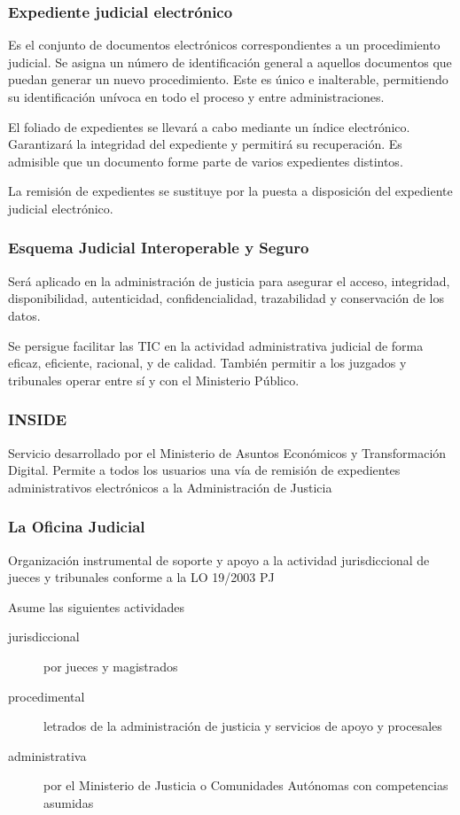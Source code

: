     \subsubsection{Expediente judicial electrónico } %
        Es el conjunto de documentos electrónicos correspondientes a un procedimiento judicial. Se asigna un número de identificación general a aquellos documentos que puedan generar un nuevo procedimiento. Este es único e inalterable, permitiendo su identificación unívoca en todo el proceso y entre administraciones.

        El foliado de expedientes se llevará a cabo mediante un índice electrónico. Garantizará la integridad del expediente y permitirá su recuperación. Es admisible que un documento forme parte de varios expedientes distintos.

        La remisión de expedientes se sustituye por la puesta a disposición del expediente judicial electrónico.

    \subsubsection{Esquema Judicial Interoperable y Seguro} %
        Será aplicado en la administración de justicia para asegurar el acceso, integridad, disponibilidad, autenticidad, confidencialidad, trazabilidad y conservación de los datos.

        Se persigue facilitar las TIC en la actividad administrativa judicial de forma eficaz, eficiente, racional, y de calidad. También permitir a los juzgados y tribunales operar entre sí y con el Ministerio Público.

    \subsubsection{INSIDE} %
        Servicio desarrollado por el Ministerio de Asuntos Económicos y Transformación Digital. Permite a todos los usuarios una vía de remisión de expedientes administrativos electrónicos a la Administración de Justicia

    \subsubsection{La Oficina Judicial} %
        Organización instrumental de soporte y apoyo a la actividad jurisdiccional de jueces y tribunales conforme a la LO 19/2003 PJ

        Asume las siguientes actividades
        \begin{description}
            \item[jurisdiccional] por jueces y magistrados
            \item[procedimental] letrados de la administración de justicia y servicios de apoyo y procesales
            \item[administrativa] por el Ministerio de Justicia o Comunidades Autónomas con competencias asumidas
        \end{description}

